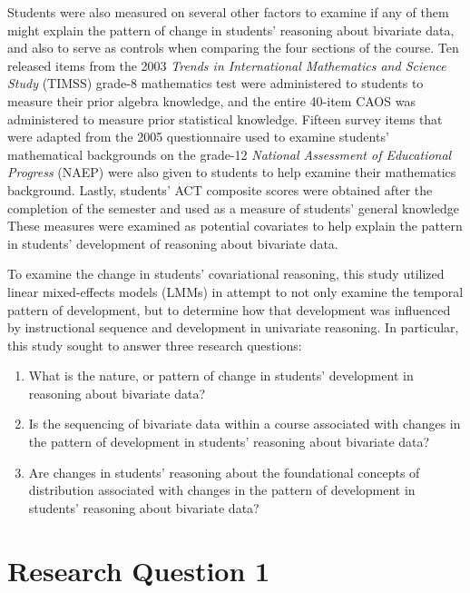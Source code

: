 \documentclass[11pt]{umnthesis}
\begin{document}
Students were also measured on several other factors to examine if any of them might explain the pattern of change in students' reasoning about bivariate data, and also to serve as controls when comparing the four sections of the course. Ten released items from the 2003 \emph{Trends in International Mathematics and Science Study} (TIMSS) grade-8 mathematics test were administered to students to measure their prior algebra knowledge, and the entire 40-item CAOS was administered to measure prior statistical knowledge. Fifteen survey items that were adapted from the 2005 questionnaire used to examine students' mathematical backgrounds on the grade-12 \emph{National Assessment of Educational Progress} (NAEP) were also given to students to help examine their mathematics background. Lastly, students' ACT composite scores were obtained after the completion of the semester and used as a measure of students' general knowledge These measures were examined as potential covariates to help explain the pattern in students' development of reasoning about bivariate data.

To examine the change in students' covariational reasoning, this study utilized linear mixed-effects models (LMMs) in attempt to not only examine the temporal pattern of development, but to determine how that development was influenced by instructional sequence and development in univariate reasoning. In particular, this study sought to answer three research questions:

\begin{enumerate}
\def\labelenumi{\arabic{enumi}.}
\tightlist
\item
  What is the nature, or pattern of change in students' development in reasoning about bivariate data?
\item
  Is the sequencing of bivariate data within a course associated with changes in the pattern of development in students' reasoning about bivariate data?
\item
  Are changes in students' reasoning about the foundational concepts of distribution associated with changes in the pattern of development in students' reasoning about bivariate data?
\end{enumerate}

\hypertarget{research-question-1}{%
\section{Research Question 1}\label{research-question-1}}
\end{document}
